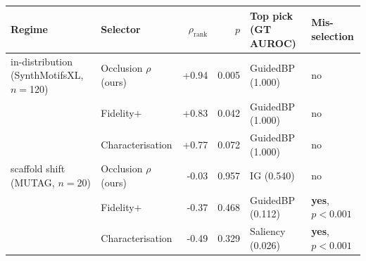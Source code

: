 \begin{tabular}{llrrll}
\toprule
Regime & Selector & $\rho_{\mathrm{rank}}$ & $p$ & Top pick (GT AUROC) & Mis-selection \\
\midrule
in-distribution (SynthMotifsXL, $n=$120) & Occlusion $\rho$ (ours) & +0.94 & 0.005 & GuidedBP (1.000) & no \\
 & Fidelity$+$ & +0.83 & 0.042 & GuidedBP (1.000) & no \\
 & Characterisation & +0.77 & 0.072 & GuidedBP (1.000) & no \\
\addlinespace
scaffold shift (MUTAG, $n=$20) & Occlusion $\rho$ (ours) & -0.03 & 0.957 & IG (0.540) & no \\
 & Fidelity$+$ & -0.37 & 0.468 & GuidedBP (0.112) & \textbf{yes}, $p<0.001$ \\
 & Characterisation & -0.49 & 0.329 & Saliency (0.026) & \textbf{yes}, $p<0.001$ \\
\bottomrule
\end{tabular}
